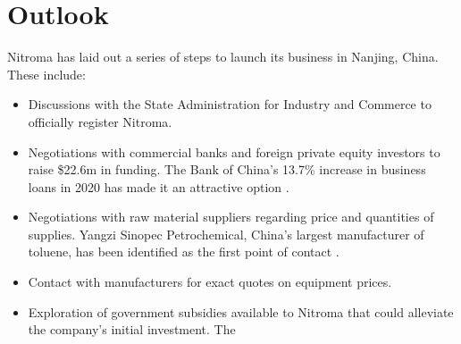\section{Outlook}
Nitroma has laid out a series of steps to launch its business in Nanjing, China. These include:
\begin{itemize}
    \item Discussions with the State Administration for Industry and Commerce to officially register Nitroma.
    \item Negotiations with commercial banks and foreign private equity investors to raise \$22.6m in funding. The Bank of China’s 13.7\% increase in business loans in 2020 has made it an attractive option \cite{kimathi_china_2020}.
    \item Negotiations with raw material suppliers regarding price and quantities of supplies. Yangzi Sinopec Petrochemical, China’s largest manufacturer of toluene, has been identified as the first point of contact \cite{sinopec_group_sinopec_2014}.
    \item Contact with manufacturers for exact quotes on equipment prices.
    \item Exploration of government subsidies available to Nitroma that could alleviate the company’s initial investment. The 
    
\end{itemize}



